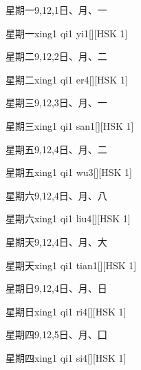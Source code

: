 \begin{Entry}{星期一}{9,12,1}{⽇、⽉、⼀}
  \begin{Phonetics}{星期一}{xing1 qi1 yi1}[][HSK 1]
  \end{Phonetics}
\end{Entry}

\begin{Entry}{星期二}{9,12,2}{⽇、⽉、⼆}
  \begin{Phonetics}{星期二}{xing1 qi1 er4}[][HSK 1]
  \end{Phonetics}
\end{Entry}

\begin{Entry}{星期三}{9,12,3}{⽇、⽉、⼀}
  \begin{Phonetics}{星期三}{xing1 qi1 san1}[][HSK 1]
  \end{Phonetics}
\end{Entry}

\begin{Entry}{星期五}{9,12,4}{⽇、⽉、⼆}
  \begin{Phonetics}{星期五}{xing1 qi1 wu3}[][HSK 1]
  \end{Phonetics}
\end{Entry}

\begin{Entry}{星期六}{9,12,4}{⽇、⽉、⼋}
  \begin{Phonetics}{星期六}{xing1 qi1 liu4}[][HSK 1]
  \end{Phonetics}
\end{Entry}

\begin{Entry}{星期天}{9,12,4}{⽇、⽉、⼤}
  \begin{Phonetics}{星期天}{xing1 qi1 tian1}[][HSK 1]
  \end{Phonetics}
\end{Entry}

\begin{Entry}{星期日}{9,12,4}{⽇、⽉、⽇}
  \begin{Phonetics}{星期日}{xing1 qi1 ri4}[][HSK 1]
  \end{Phonetics}
\end{Entry}

\begin{Entry}{星期四}{9,12,5}{⽇、⽉、⼞}
  \begin{Phonetics}{星期四}{xing1 qi1 si4}[][HSK 1]
  \end{Phonetics}
\end{Entry}

